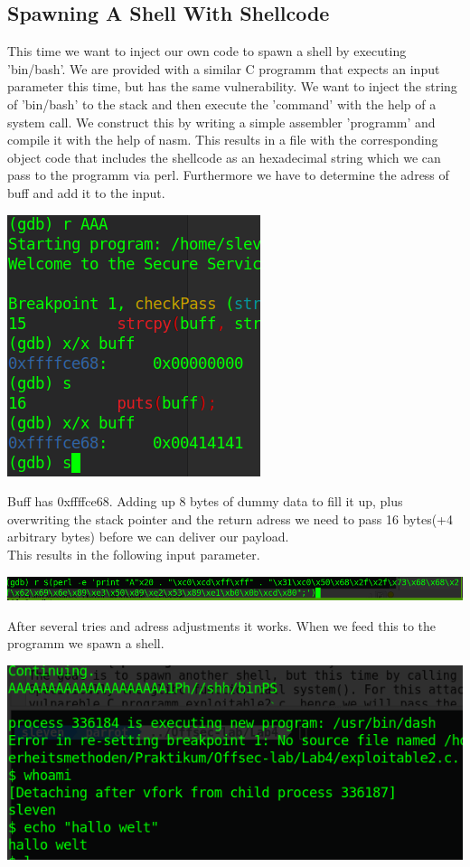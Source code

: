 \documentclass[a4paper,10pt]{article}
\begin{document}
\subsection{Spawning A Shell With Shellcode}
This time we want to inject our own code to spawn a shell by executing 'bin/bash'. We are provided with a similar C programm that expects an input parameter this time, but has the same vulnerability. We want to inject the string of 'bin/bash' to the stack and then execute the 'command' with the help of a system call.
We construct this by writing a simple assembler 'programm' and compile it with the help of nasm. This results in a file with the corresponding object code that includes the shellcode as an hexadecimal string which we can pass to the programm via perl. 
Furthermore we have to determine the adress of buff and add it to the input.
\begin{center}
 \includegraphics[scale=0.5]{breakpoint.png}
\end{center}
Buff has 0xffffce68. Adding up 8 bytes of dummy data to fill it up, plus overwriting the stack pointer and the return adress we need to pass 16 bytes(+4 arbitrary bytes) before we can deliver our payload.\\
This results in the following input parameter.
\begin{center}
 \includegraphics[scale=0.4]{pay2.png}
\end{center}
After several tries and adress adjustments it works.
When we feed this to the programm we spawn a shell.
\begin{center}
 \includegraphics[scale=0.5]{shells.png}
\end{center}
\end{document}
